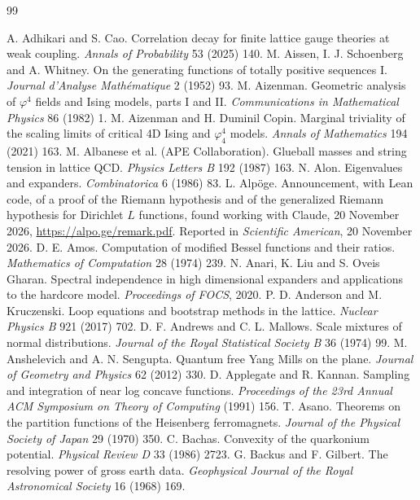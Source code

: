 \begin{thebibliography}{99}\small\setlength{\itemsep}{2pt}\setlength{\parskip}{0pt}
 A. Adhikari and S. Cao. Correlation decay for finite lattice gauge theories at weak coupling. \emph{Annals of Probability} 53 (2025) 140.
 M. Aissen, I. J. Schoenberg and A. Whitney. On the generating functions of totally positive sequences I. \emph{Journal d'Analyse Math\'ematique} 2 (1952) 93.
 M. Aizenman. Geometric analysis of $\varphi^4$ fields and Ising models, parts I and II. \emph{Communications in Mathematical Physics} 86 (1982) 1.
 M. Aizenman and H. Duminil Copin. Marginal triviality of the scaling limits of critical 4D Ising and $\varphi^4_4$ models. \emph{Annals of Mathematics} 194 (2021) 163.
 M. Albanese et al. (APE Collaboration). Glueball masses and string tension in lattice QCD. \emph{Physics Letters B} 192 (1987) 163.
 N. Alon. Eigenvalues and expanders. \emph{Combinatorica} 6 (1986) 83.
 L. Alp\"oge. Announcement, with Lean code, of a proof of the Riemann hypothesis and of the generalized Riemann hypothesis for Dirichlet $L$ functions, found working with Claude, 20 November 2026, \url{https://alpo.ge/remark.pdf}. Reported in \emph{Scientific American}, 20 November 2026.
 D. E. Amos. Computation of modified Bessel functions and their ratios. \emph{Mathematics of Computation} 28 (1974) 239.
 N. Anari, K. Liu and S. Oveis Gharan. Spectral independence in high dimensional expanders and applications to the hardcore model. \emph{Proceedings of FOCS}, 2020.
 P. D. Anderson and M. Kruczenski. Loop equations and bootstrap methods in the lattice. \emph{Nuclear Physics B} 921 (2017) 702.
 D. F. Andrews and C. L. Mallows. Scale mixtures of normal distributions. \emph{Journal of the Royal Statistical Society B} 36 (1974) 99.
 M. Anshelevich and A. N. Sengupta. Quantum free Yang Mills on the plane. \emph{Journal of Geometry and Physics} 62 (2012) 330.
 D. Applegate and R. Kannan. Sampling and integration of near log concave functions. \emph{Proceedings of the 23rd Annual ACM Symposium on Theory of Computing} (1991) 156.
 T. Asano. Theorems on the partition functions of the Heisenberg ferromagnets. \emph{Journal of the Physical Society of Japan} 29 (1970) 350.
 C. Bachas. Convexity of the quarkonium potential. \emph{Physical Review D} 33 (1986) 2723.
 G. Backus and F. Gilbert. The resolving power of gross earth data. \emph{Geophysical Journal of the Royal Astronomical Society} 16 (1968) 169.

\end{thebibliography}
